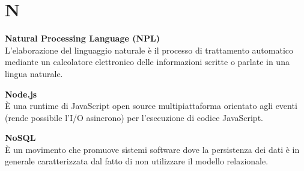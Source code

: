 \section{N}
\textbf{Natural Processing Language (NPL)}\\
L'elaborazione del linguaggio naturale è il processo di trattamento automatico mediante un calcolatore elettronico delle informazioni scritte o parlate in una lingua naturale.

\textbf{Node.js}\\
È una runtime di JavaScript open source multipiattaforma orientato agli eventi (rende possibile l’I/O asincrono) per l'esecuzione di codice JavaScript.

\textbf{NoSQL}\\
È un movimento che promuove sistemi software dove la persistenza dei dati è in generale caratterizzata dal fatto di non utilizzare il modello relazionale.

\clearpage